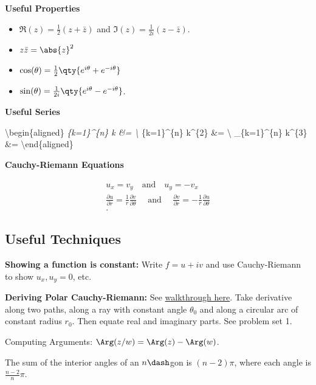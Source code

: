 \textbf{Useful Properties}

\begin{itemize}
\tightlist
\item
  \(\Re(z) = \frac 1 2 (z + \bar z)\) and
  \(\Im(z) = \frac{1}{2i}(z - \bar z)\).
\item
  \(z\bar z = \abs{z}^2\)
\item
  \(\cos(\theta) = \frac 1 2 \qty{e^{i\theta} + e^{-i\theta}}\)
\item
  \(\sin(\theta) = \frac{1}{2i}\qty{e^{i\theta} - e^{-i\theta}}\).
\end{itemize}

\textbf{Useful Series}

\textbackslash begin\{aligned\} \sum\emph{\{k=1\}\^{}\{n\} k
\&= \textbackslash{} \sum}\{k=1\}\^{}\{n\} k\^{}\{2\}
\&= \textbackslash{} \sum\_\{k=1\}\^{}\{n\}
k\^{}\{3\} \&= \textbackslash end\{aligned\}

\textbf{Cauchy-Riemann Equations}

\begin{align*}
u_x = v_y \quad\text{and}\quad u_y = -v_x \\
\frac{\partial u}{\partial r}=\frac{1}{r} \frac{\partial v}{\partial \theta} \quad \text { and } \quad \frac{\partial v}{\partial r}=-\frac{1}{r} \frac{\partial u}{\partial \theta} \\
.\end{align*}

\hypertarget{useful-techniques}{%
\subsection{Useful Techniques}\label{useful-techniques}}

\textbf{Showing a function is constant:} Write \(f = u + iv\) and use
Cauchy-Riemann to show \(u_x, u_y = 0\), etc.

\textbf{Deriving Polar Cauchy-Riemann:} See
\href{https://users.math.msu.edu/users/shapiro/Teaching/classes/425/crpolar.pdf}{walkthrough
here}. Take derivative along two paths, along a ray with constant angle
\(\theta_0\) and along a circular arc of constant radius \(r_0\). Then
equate real and imaginary parts. See problem set 1.

Computing Arguments: \(\Arg(z/w) = \Arg(z) - \Arg(w)\).

The sum of the interior angles of an \(n\dash\)gon is \((n-2)\pi\),
where each angle is \(\frac{n-2}{n}\pi\).





